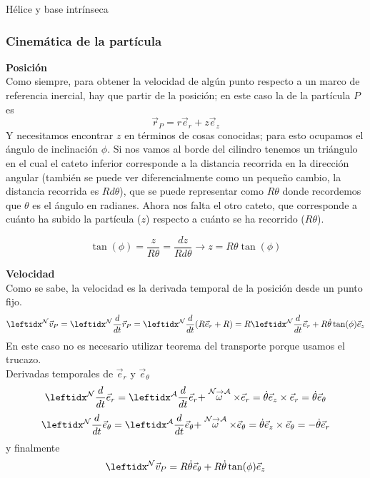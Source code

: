 \begin{solucion}{Hélice y base intrínseca}
\subsubsection*{Cinemática de la partícula}
\textbf{Posición}\\
Como siempre, para obtener la velocidad de algún punto respecto a un marco de referencia inercial, hay que partir de la posición; en este caso la de la partícula $P$ es
$$\vec{r}_P=r\vec{e}_r+z\vec{e}_z$$
Y necesitamos encontrar $z$ en términos de cosas conocidas; para esto ocupamos el ángulo de inclinación $\phi$. Si nos vamos al borde del cilindro tenemos un triángulo en el cual el cateto inferior corresponde a la distancia recorrida en la dirección angular (también se puede ver diferencialmente como un pequeño cambio, la distancia recorrida es $Rd\theta$), que se puede representar como $R\theta$ donde recordemos que $\theta$ es el ángulo en radianes. Ahora nos falta el otro cateto, que corresponde a cuánto ha subido la partícula ($z$) respecto a cuánto se ha recorrido ($R\theta$).
\begin{center}
\end{center}
$$\tan(\phi)=\dfrac{z}{R\theta}=\dfrac{dz}{Rd\theta}\longrightarrow z=R\theta\tan(\phi)$$


\textbf{Velocidad}\\
Como se sabe, la velocidad es la derivada temporal de la posición desde un punto fijo.
$$\marc{\vec{v}_P}{N}=\der{\vec{r}_{P}}{N}=\der{(R\vec{e}_r+R)}{N}= R\der{\vec{e}_r}{N}+R\dot\theta\tan(\phi)\vec{e}_z$$
En este caso no es necesario utilizar teorema del transporte porque usamos el trucazo.\\
Derivadas temporales de $\vec{e}_r$ y $\vec{e}_\theta$
$$\transport{\vec{e}_r}{N}{A}=\dot\theta\vec{e}_z\times\vec{e}_r=\dot\theta\vec{e}_\theta $$
$$\transport{\vec{e}_\theta}{N}{A}=\dot\theta\vec{e}_z\times\vec{e}_\theta=-\dot\theta\vec{e}_r $$
y finalmente
$$\marc{\vec{v}_P}{N}=R\dot\theta\vec{e}_\theta+R\dot\theta\tan(\phi)\vec{e}_z$$


\end{solucion}
